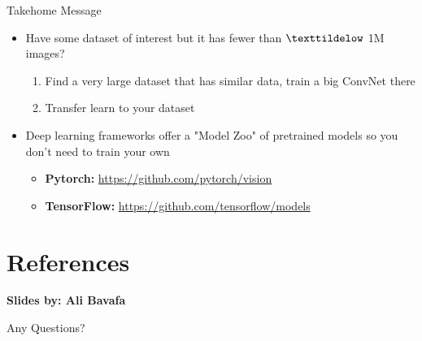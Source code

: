 \documentclass[serif, aspectratio=169]{beamer}
\begin{document}
\begin{frame}{Takehome Message}
	\begin{itemize}
		\item Have some dataset of interest but it has fewer than $\texttildelow$ 1M images?
		\begin{enumerate}
			\item Find a very large dataset that has similar data, train a big ConvNet there
			\item Transfer learn to your dataset
		\end{enumerate}
		\item Deep learning frameworks offer a "Model Zoo" of pretrained models so you don't need to train your own
		\begin{itemize}
			\item \textbf{Pytorch:} \href{https://github.com/pytorch/vision}{\color{blue} https://github.com/pytorch/vision}
			\item \textbf{TensorFlow:} \href{https://github.com/tensorflow/models}{\color{blue} https://github.com/tensorflow/models}
		\end{itemize}

	\end{itemize}
\end{frame}

\section{References}

\begin{frame}[allowframebreaks]
	\textbf{Slides by: Ali Bavafa}
	\vspace{1cm}
	
	
	\nocite{*} %
\end{frame}


\begin{frame}
	\begin{center}
		{\Huge Any Questions?}
	\end{center}
\end{frame}
\end{document}
